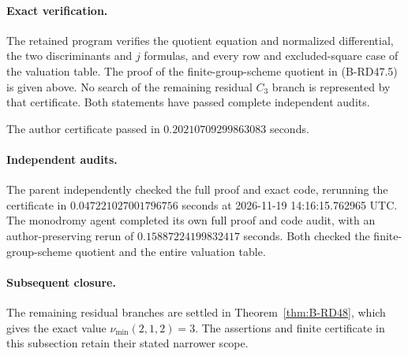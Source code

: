 \paragraph{Exact verification.}
The retained program
verifies the quotient equation and normalized differential,
the two discriminants and $j$ formulas, and every row and
excluded-square case of the valuation table. The proof of
the finite-group-scheme quotient in (B-RD47.5) is given
above. No search of the remaining residual $C_3$ branch is
represented by that certificate. Both statements have passed complete independent audits.

The author certificate passed in $0.20210709299863083$ seconds.

\paragraph{Independent audits.}
The parent independently checked the full proof and exact code,
rerunning the certificate in $0.047221027001796756$ seconds
at 2026-11-19 14:16:15.762965 UTC. The monodromy agent completed
its own full proof and code audit, with an author-preserving
rerun of $0.15887224199832417$ seconds. Both checked the
finite-group-scheme quotient and the entire valuation table.

\paragraph{Subsequent closure.}
The remaining residual branches are settled in
Theorem~\ref{thm:B-RD48}, which gives the exact value
$\nu_{\min}(2,1,2)=3$. The assertions and finite certificate
in this subsection retain their stated narrower scope.
